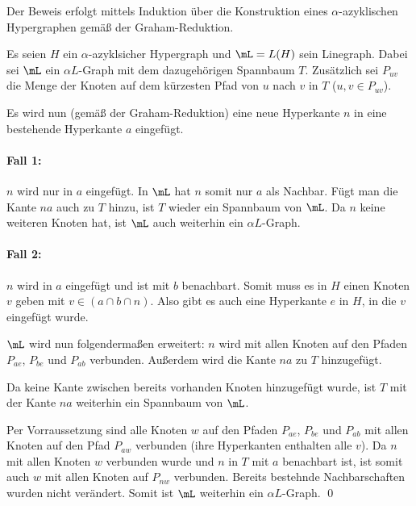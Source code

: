 \begin{Proof}
    Der Beweis erfolgt mittels Induktion über die Konstruktion eines $\alpha$-azyklischen Hypergraphen gemäß der Graham-Reduktion.
    
    Es seien $H$ ein $\alpha$-azyklsicher Hypergraph und $\mL=L(H)$ sein Linegraph. Dabei sei $\mL$ ein $\alpha L$-Graph mit dem dazugehörigen Spannbaum $T$. Zusätzlich sei $P_{uv}$ die Menge der Knoten auf dem kürzesten Pfad von $u$ nach $v$ in $T$ ($u,v\in P_{uv}$).
    
    Es wird nun (gemäß der Graham-Reduktion) eine neue Hyperkante $n$ in eine bestehende Hyperkante $a$ eingefügt.
    
    \paragraph{Fall 1:} $n$ wird nur in $a$ eingefügt. In $\mL$ hat $n$ somit nur $a$ als Nachbar. Fügt man die Kante $na$ auch zu $T$ hinzu, ist $T$ wieder ein Spannbaum von $\mL$. Da $n$ keine weiteren Knoten hat, ist $\mL$ auch weiterhin ein $\alpha L$-Graph.
    
    
    \paragraph{Fall 2:} $n$ wird in $a$ eingefügt und ist mit $b$ benachbart. Somit muss es in $H$ einen Knoten $v$ geben mit $v\in(a\cap b \cap n)$. Also gibt es auch eine Hyperkante $e$ in $H$, in die $v$ eingefügt wurde.
    
    $\mL$ wird nun folgendermaßen erweitert: $n$ wird mit allen Knoten auf den Pfaden $P_{ae}$, $P_{be}$ und $P_{ab}$ verbunden. Außerdem wird die Kante $na$ zu $T$ hinzugefügt.
    
    
    Da keine Kante zwischen bereits vorhanden Knoten hinzugefügt wurde, ist $T$ mit der Kante $na$ weiterhin ein Spannbaum von $\mL$.
    
    Per Vorraussetzung sind alle Knoten $w$ auf den Pfaden $P_{ae}$, $P_{be}$ und $P_{ab}$ mit allen Knoten auf den Pfad $P_{aw}$ verbunden (ihre Hyperkanten enthalten alle $v$). Da $n$ mit allen Knoten $w$ verbunden wurde und $n$ in $T$ mit $a$ benachbart ist, ist somit auch $w$ mit allen Knoten auf $P_{nw}$ verbunden. Bereits bestehnde Nachbarschaften wurden nicht verändert. Somit ist $\mL$ weiterhin ein $\alpha L$-Graph.
    \qed
\end{Proof}

